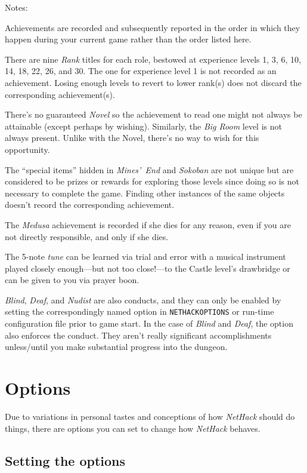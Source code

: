 \noindent
Notes:

Achievements are recorded and subsequently reported in the order in which
they happen during your current game rather than the order listed here.

There are nine {\it Rank} titles for each role, bestowed at experience
levels 1, 3, 6, 10, 14, 18, 22, 26, and 30.
The one for experience level 1 is not recorded as an achievement.
Losing enough levels to revert to lower rank(s) does not discard the
corresponding achievement(s).

There's no guaranteed {\it Novel} so the achievement to read one might
not always be attainable (except perhaps by wishing).
Similarly, the {\it Big Room} level is not always present.
Unlike with the Novel, there's no way to wish for this opportunity.

The ``special items'' hidden in {\it Mines'~End\/} and {\it Sokoban\/}
are not unique but are considered to be prizes or rewards
for exploring those levels since doing so is not necessary to complete
the game.
Finding other instances of the same objects doesn't record the
corresponding achievement.

The {\it Medusa\/} achievement is recorded if she dies for any reason,
even if you are not directly responsible, and only if she dies.

The 5-note {\it tune\/} can be learned via trial and error with a musical
instrument played closely
enough---but not too close!---to
the Castle level's drawbridge or can be given to you via prayer boon.

{\it Blind\/}, {\it Deaf\/}, and {\it Nudist\/} are also conducts, and they can only be
enabled by setting the correspondingly named option in {\tt NETHACKOPTIONS}
or run-time configuration file prior to game start.
In the case of {\it Blind\/} and {\it Deaf\/}, the option also enforces the conduct.
They aren't really significant accomplishments unless/until you make
substantial progress into the dungeon.

\section{Options}

Due to variations in personal tastes and conceptions of how {\it NetHack\/}
should do things, there are options you can set to change how {\it NetHack\/}
behaves.

\subsection*{Setting the options}

